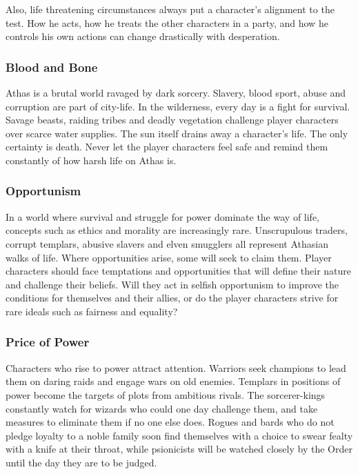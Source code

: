 Also, life threatening circumstances always put a character's alignment to the test. How he acts, how he treats the other characters in a party, and how he controls his own actions can change drastically with desperation.

\subsubsection{Blood and Bone}
Athas is a brutal world ravaged by dark sorcery. Slavery, blood sport, abuse and corruption are part of city-life. In the wilderness, every day is a fight for survival. Savage beasts, raiding tribes and deadly vegetation challenge player characters over scarce water supplies. The sun itself drains away a character's life. The only certainty is death. Never let the player characters feel safe and remind them constantly of how harsh life on Athas is.

\subsubsection{Opportunism}
In a world where survival and struggle for power dominate the way of life, concepts such as ethics and morality are increasingly rare. Unscrupulous traders, corrupt templars, abusive slavers and elven smugglers all represent Athasian walks of life. Where opportunities arise, some will seek to claim them. Player characters should face temptations and opportunities that will define their nature and challenge their beliefs. Will they act in selfish opportunism to improve the conditions for themselves and their allies, or do the player characters strive for rare ideals such as fairness and equality?

\subsubsection{Price of Power}
Characters who rise to power attract attention. Warriors seek champions to lead them on daring raids and engage wars on old enemies. Templars in positions of power become the targets of plots from ambitious rivals. The sorcerer-kings constantly watch for wizards who could one day challenge them, and take measures to eliminate them if no one else does. Rogues and bards who do not pledge loyalty to a noble family soon find themselves with a choice to swear fealty with a knife at their throat, while psionicists will be watched closely by the Order until the day they are to be judged.


